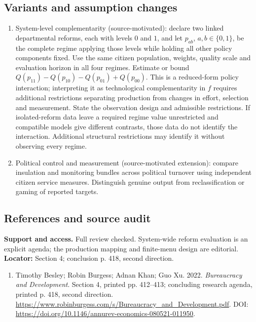 \documentclass[11pt,a4paper]{article}
\begin{document}
\subsection*{Variants and assumption changes}
\begin{enumerate}
\item System-level complementarity (source-motivated): declare two linked departmental reforms, each with levels \(0\) and \(1\), and let \(p_{ab}\), \(a,b\in\{0,1\}\), be the complete regime applying those levels while holding all other policy components fixed. Use the same citizen population, weights, quality scale and evaluation horizon in all four regimes. Estimate or bound \(Q(p_{11})-Q(p_{10})-Q(p_{01})+Q(p_{00})\). This is a reduced-form policy interaction; interpreting it as technological complementarity in \(f\) requires additional restrictions separating production from changes in effort, selection and measurement. State the observation design and admissible restrictions. If isolated-reform data leave a required regime value unrestricted and compatible models give different contrasts, those data do not identify the interaction. Additional structural restrictions may identify it without observing every regime.
\item Political control and measurement (source-motivated extension): compare insulation and monitoring bundles across political turnover using independent citizen service measures. Distinguish genuine output from reclassification or gaming of reported targets.
\end{enumerate}
\subsection*{References and source audit}
\textbf{Support and access.} Full review checked. System-wide reform evaluation is an explicit agenda; the production mapping and finite-menu design are editorial. \textbf{Locator:} Section 4; conclusion p. 418, second direction.
\begin{enumerate}\raggedright
\item\hypertarget{definitions:source:30007664:1}{} Timothy Besley; Robin Burgess; Adnan Khan; Guo Xu. 2022. \emph{Bureaucracy and Development}. Section 4, printed pp. 412–413; concluding research agenda, printed p. 418, second direction.
\url{https://www.robinburgess.com/s/Bureaucracy_and_Development.pdf}.
DOI: \url{https://doi.org/10.1146/annurev-economics-080521-011950}.
\end{enumerate}
\end{document}
